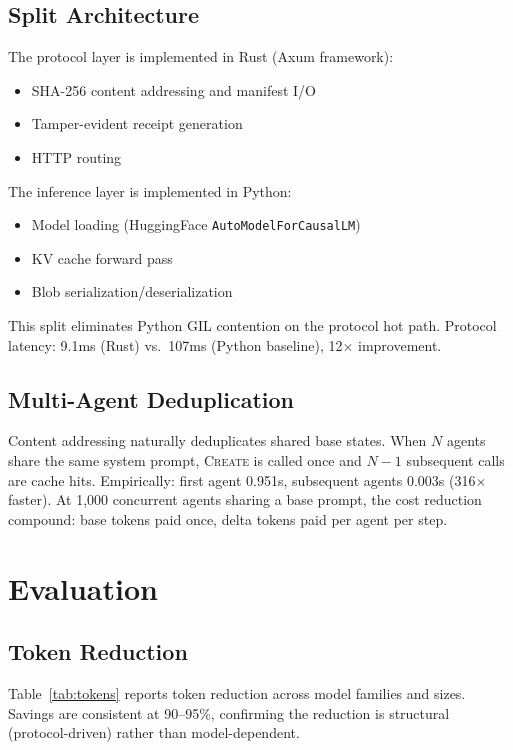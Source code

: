 \documentclass[11pt,a4paper]{article}
\begin{document}
\subsection{Split Architecture}

The protocol layer is implemented in Rust (Axum framework):
\begin{itemize}
  \item SHA-256 content addressing and manifest I/O
  \item Tamper-evident receipt generation
  \item HTTP routing
\end{itemize}

The inference layer is implemented in Python:
\begin{itemize}
  \item Model loading (HuggingFace \texttt{AutoModelForCausalLM})
  \item KV cache forward pass
  \item Blob serialization/deserialization
\end{itemize}

This split eliminates Python GIL contention on the protocol hot path.
Protocol latency: 9.1ms (Rust) vs.\ 107ms (Python baseline), 12$\times$
improvement.

\subsection{Multi-Agent Deduplication}

Content addressing naturally deduplicates shared base states. When $N$ agents
share the same system prompt, \textsc{Create} is called once and $N-1$
subsequent calls are cache hits. Empirically: first agent 0.951s, subsequent
agents 0.003s (316$\times$ faster). At 1,000 concurrent agents sharing a base
prompt, the cost reduction compound: base tokens paid once, delta tokens paid
per agent per step.

\section{Evaluation}
\label{sec:eval}

\subsection{Token Reduction}

Table~\ref{tab:tokens} reports token reduction across model families and
sizes. Savings are consistent at 90--95\%, confirming the reduction is
structural (protocol-driven) rather than model-dependent.
\end{document}
